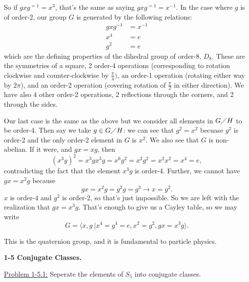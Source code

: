 \documentclass[12pt]{article}
\begin{document}
So if $gxg^{=1} = x^3$, that's the same as saying $gxg^{=1} = x^{-1}$. In the
case where $g$ is of order-2, our group $G$ is generated by the following
relations:
\begin{align*}
    gxg^{-1} &= x^{-1}\\
         x^4 &= e\\
         g^2 &=e
\end{align*}
which are the defining properties of the dihedral group of order-8, $D_8$.
These are the symmetries of a square, 2 order-4 operations (corresponding to
rotation clockwise and counter-clockwise by $\frac{\pi}{4})$, an order-1
operation (rotating either way by  $2\pi$), and an order-2 operation (covering
rotation of  $\frac{\pi}{2}$ in either direction). We have also 4 other
order-2 operations, 2 reflections through the corners, and 2 through the sides.

Our last case is the same as the above but we consider all elements in
$G \diagup H$ to be order-4. Then say we take $g \in G \diagup H$: we can see
that $g^2 = x^2$ becuase $g^2$ is order-2 and the only order-2 element in $G$
is $x^2$. We also see that $G$ is non-abelian. If it were, and $gx = xg$, then
\[
    (x^3g)^2 = x^3gx^3g = x^6g^2 = x^2g^2 = x^2x^2 = x^4 = e, 
\]
contradicting the fact that the element $x^3g$ is order-4. Further, we cannot
have $gx = x^2g$ because
\[
gx = x^2g = g^2g = g^3 \rightarrow x = g^2.
\]
$x$ is order-4 and $g^2$ is order-2, so that's just impossible. So we are left
with the realization that $gx = x^3g$. That's enough to give us a Cayley table,
so we may write
\[
 G = \langle x, g\ | x^4 = g^4 = e, x^2 = g^2, gx = x^3g \rangle.
\]

This is the quaternion group, and it is fundamental to particle physics.

\newpage

\textbf{1-5 Conjugate Classes.}

\underline{Problem 1-5.1:} Seperate the elements of $S_5$ into conjugate
classes.
\end{document}
